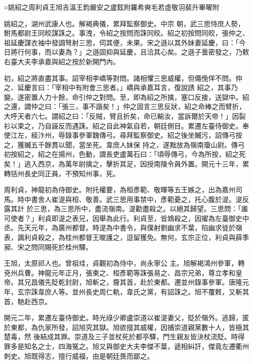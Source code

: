 
\begin{pinyinscope}

 ○姚紹之周利貞王旭吉溫王鈞嚴安之盧鉉附羅希奭毛若虛敬羽裴升畢曜附



 姚紹之，湖州武康人也。解褐典儀，累拜監察御史。中宗
 朝，武三思恃庶人勢，駙馬都尉王同皎謀誅之。事洩，令紹之按問而誅同皎。紹之初按問同皎，張仲之、祖延慶謀衣袖中發調弩射三思，伺其便，未果。宋之遜以其外妹妻延慶，曰：「今日將行何事，而以妻為？」之遜固抑與延慶，且洽其心矣。之遜子曇密發之，乃敕右臺大夫李承嘉與紹之按於新開門內。



 初，紹之將直盡其事。詔宰相李嶠等對問。諸相懼三思威權，但僶俛佯不問。仲之、延慶言曰：「宰相中有附會三思者。」嶠與承嘉耳言，復說誘
 紹之，其事乃變。遂密置人力十餘，命引仲之對問。至，即為紹之所擒，塞口反接，送獄中。紹之還，謂仲之曰：「張三，事不諧矣！」仲之固言三思反狀，紹之命棒之而臂折，大呼天者六七。謂紹之曰：「反賊，臂且折矣，命已輸汝，當訴爾於天帝！」因裂衫以束之，乃自誣反而遇誅。紹之自此神氣自若，朝廷側目。累遷左臺侍御史。奉使江左，經汴州，辱錄事參軍魏傳弓。尋拜監察御史。紹之後坐贓污，詔傳弓按之，獲贓五千餘貫以聞，當坐死。韋庶人妹保
 持之，遂黜放為嶺南瓊山尉。傳弓初按紹之，紹之在揚州，色動，謂長吏盧萬石曰：「頃辱傳弓，今為所按，紹之死矣！」逃入西京，為萬年尉擒之，擊折其足，因授南陵令員外置。開元十三年，累轉括州長史同正員，不預知州事，死。



 周利貞，神龍初為侍御史。附托權要，為桓彥範、敬暉等五王嫉之，出為嘉州司馬。時中書舍人崔湜與桓、敬善。武三思用事禁中，彥範憂之，托心腹於湜。湜反露其計
 於三思，為三思所中，盡流嶺南。湜勸盡殺之。以絕其歸望。三思問：「誰可使者？」利貞即湜之表兄，因舉為此行。利貞至，皆鴆殺之，因擢為左臺御史中丞。先天元年，為廣州都督。時湜為中書令，與僕射劉幽求不葉，陷幽求徙於嶺表，諷利貞殺之，為桂州都督王晙護之，逗留獲免。無何，玄宗正位，利貞與薛季昶、宋之問同賜死於桂州驛。



 王旭，太原祁人也。曾祖珪，貞觀初為侍中，尚永寧公
 主。旭解褐鴻州參軍，轉兗州兵曹。神龍元年正月，張柬之、桓彥範等誅張易之、昌宗兄弟，尊立孝和皇帝。其兄昌儀先貶乾封尉，旭斬之，齎其首，赴於東都。遷並州錄事參軍。唐隆元年，玄宗誅韋庶人等。並州長史周仁軌，韋氏之黨，有詔誅之。旭不覆敕，又斬其首，馳赴西京。



 開元二年，累遷左臺侍御史。時光祿少卿盧崇道以崔湜妻父，貶於嶺外。逃歸，匿於東都，為仇家所發，詔旭究其獄。旭欲擅其威權，因捕崇道親黨數十人，皆極其楚毒，然
 後結成其罪。崇道及三子並杖死於都亭驛，門生親友皆決杖流貶。時得罪多是知名之士，四海冤之。旭又與御史大夫李傑不葉，遞相糾訐，傑竟左遷衢州刺史。旭既得志，擅行威福，由是朝廷畏而鄙之。




\end{pinyinscope}
